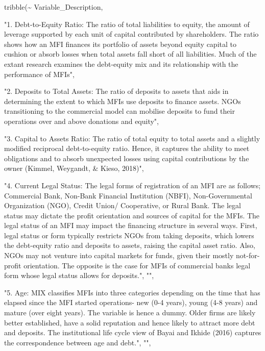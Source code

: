 \documentclass[a4paper,nobind]{templates/ociamthesis}
\newenvironment{Shaded}{\begin{snugshade}}{\end{snugshade}}
\newcommand{\FunctionTok}[1]{\textcolor[rgb]{0.00,0.00,0.00}{#1}}
\newcommand{\NormalTok}[1]{#1}
\newcommand{\SpecialCharTok}[1]{\textcolor[rgb]{0.00,0.00,0.00}{#1}}
\newcommand{\StringTok}[1]{\textcolor[rgb]{0.31,0.60,0.02}{#1}}
\renewenvironment{Shaded}
{
  \vspace{10pt}%
  \begin{snugshade}%
}{%
  \end{snugshade}%
  \vspace{8pt}%
}
\begin{document}
\begin{Shaded}
\begin{Highlighting}[]
\FunctionTok{tribble}\NormalTok{(}\SpecialCharTok{\textasciitilde{}}\NormalTok{ Variable\_Description, }

\StringTok{"1. Debt{-}to{-}Equity Ratio: The ratio of total liabilities to equity, the amount of leverage supported by each unit of capital contributed by shareholders. The ratio shows how an MFI finances its portfolio of assets beyond equity capital to cushion or absorb losses when total assets fall short of all liabilities. Much of the extant research examines the debt{-}equity mix and its relationship with the performance of MFIs"}\NormalTok{,}

\StringTok{"2. Deposits to Total Assets: The ratio of deposits to assets that aids in determining the extent to which MFIs use deposits to finance assets. NGOs transitioning to the commercial model can mobilise deposits  to fund their operations over and above donations and equity"}\NormalTok{,}

\StringTok{"3. Capital to Assets Ratio: The ratio of total equity to total assets and a slightly modified reciprocal debt{-}to{-}equity ratio. Hence, it captures the ability to meet obligations and to absorb unexpected losses using capital contributions by the owner (Kimmel, Weygandt, \& Kieso, 2018)"}\NormalTok{,}
        
\StringTok{"4. Current Legal Status: The legal forms of registration of an MFI are as follows; Commercial Bank, Non{-}Bank Financial Institution (NBFI), Non{-}Governmental Organization (NGO), Credit Union/ Cooperative, or Rural Bank. The legal status may dictate the profit orientation and sources of capital for the MFIs. The legal status of an MFI may impact the financing structure in several ways. First, legal status or form typically restricts NGOs from taking deposits, which lowers the debt{-}equity ratio and deposits to assets, raising the capital asset ratio. Also, NGOs may not venture into capital markets for funds, given their mostly not{-}for{-}profit orientation. The opposite is the case for MFIs of commercial banks legal form whose legal status allows for deposits."}\NormalTok{, }\StringTok{""}\NormalTok{, }
        
\StringTok{"5. Age: MIX classifies MFIs into three categories depending on the time that has elapsed since the MFI started operations{-} new (0{-}4 years), young (4{-}8 years) and mature (over eight years). The variable is hence a dummy. Older firms are likely better established, have a solid reputation and hence likely to attract more debt and deposits. The institutional life cycle view of Bayai and Ikhide (2016) captures the correspondence between age and debt."}\NormalTok{, }\StringTok{""}\NormalTok{, }


\end{Highlighting}
\end{Shaded}
\end{document}
